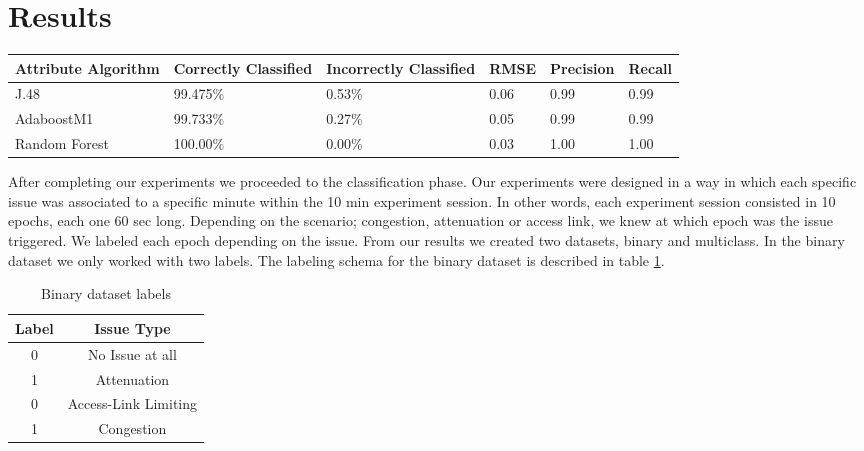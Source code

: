\section{Results}\label{Results}

\begin{table*}[bp]
	\begin{center}
		\begin{tabular}{|| m{2cm} | m{2cm}| m{2cm} | m{2cm}| m{2cm} | m{2cm}  ||}
			\hline
			Attribute Algorithm & Correctly Classified & Incorrectly Classified & RMSE & Precision & Recall \\
			\hline\hline
			J.48 & 99.475\% & 0.53\% & 0.06 & 0.99 & 0.99 \\
			\hline
			AdaboostM1 & 99.733\% & 0.27\% & 0.05 & 0.99 & 0.99 \\
			\hline
			Random Forest & 100.00\% & 0.00\% & 0.03 & 1.00 & 1.00 \\
			\hline
		\end{tabular}
	\end{center}
	\caption{Binary Dataset - Weka classification results}
	\label{table:binary_results}
\end{table*}

After completing our experiments we proceeded to the classification phase. Our experiments were designed in a way in which each specific issue was associated to a specific minute within the 10 min experiment session. In other words, each experiment session consisted in 10 epochs, each one 60 sec long. Depending on the scenario; congestion, attenuation or access link, we knew at which epoch was the issue triggered. We labeled each epoch depending on the issue. From our results we created two datasets, binary and multiclass. In the binary dataset we only worked with two labels. The labeling schema for the binary dataset is described in table \ref{table:binary_labels}.

\begin{table}[h!]
	\begin{center}
		\begin{tabular}{||c c||} 
			\hline
			Label & Issue Type\\ [0.5ex] 
			\hline\hline
			0 & No Issue at all \\ 
			\hline
			1 & Attenuation\\
			\hline
			0 & Access-Link Limiting \\
			\hline
			1 & Congestion \\[1ex] 
			\hline
		\end{tabular}
		\caption{Binary dataset labels}
		\label{table:binary_labels}
	\end{center}
\end{table}

